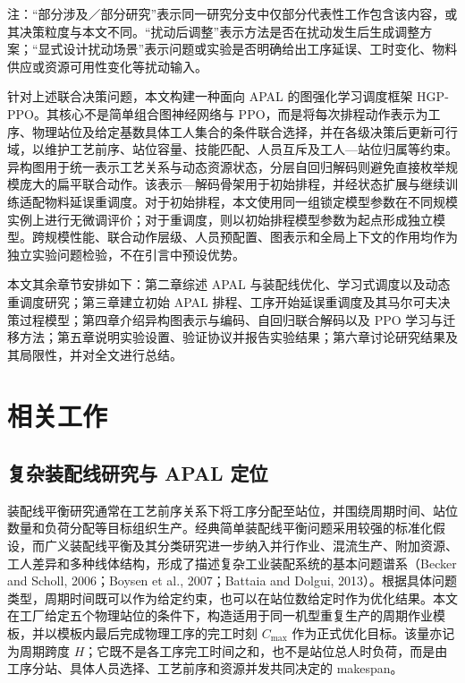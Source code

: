 \documentclass[journal,10pt]{IEEEtran}
\begin{document}
注：``部分涉及／部分研究''表示同一研究分支中仅部分代表性工作包含该内容，或其决策粒度与本文不同。``扰动后调整''表示方法是否在扰动发生后生成调整方案；``显式设计扰动场景''表示问题或实验是否明确给出工序延误、工时变化、物料供应或资源可用性变化等扰动输入。

针对上述联合决策问题，本文构建一种面向 APAL 的图强化学习调度框架 HGP-PPO。其核心不是简单组合图神经网络与 PPO，而是将每次排程动作表示为工序、物理站位及给定基数具体工人集合的条件联合选择，并在各级决策后更新可行域，以维护工艺前序、站位容量、技能匹配、人员互斥及工人---站位归属等约束。异构图用于统一表示工艺关系与动态资源状态，分层自回归解码则避免直接枚举规模庞大的扁平联合动作。该表示---解码骨架用于初始排程，并经状态扩展与继续训练适配物料延误重调度。对于初始排程，本文使用同一组锁定模型参数在不同规模实例上进行无微调评价；对于重调度，则以初始排程模型参数为起点形成独立模型。跨规模性能、联合动作层级、人员预配置、图表示和全局上下文的作用均作为独立实验问题检验，不在引言中预设优势。

本文其余章节安排如下：第二章综述 APAL 与装配线优化、学习式调度以及动态重调度研究；第三章建立初始 APAL 排程、工序开始延误重调度及其马尔可夫决策过程模型；第四章介绍异构图表示与编码、自回归联合解码以及 PPO 学习与迁移方法；第五章说明实验设置、验证协议并报告实验结果；第六章讨论研究结果及其局限性，并对全文进行总结。

\section{相关工作}\label{ux76f8ux5173ux5de5ux4f5c}

\subsection{复杂装配线研究与 APAL 定位}\label{ux590dux6742ux88c5ux914dux7ebfux7814ux7a76ux4e0e-apal-ux5b9aux4f4d}

装配线平衡研究通常在工艺前序关系下将工序分配至站位，并围绕周期时间、站位数量和负荷分配等目标组织生产。经典简单装配线平衡问题采用较强的标准化假设，而广义装配线平衡及其分类研究进一步纳入并行作业、混流生产、附加资源、工人差异和多种线体结构，形成了描述复杂工业装配系统的基本问题谱系（Becker and Scholl, 2006；Boysen et al., 2007；Battaia and Dolgui, 2013）。根据具体问题类型，周期时间既可以作为给定约束，也可以在站位数给定时作为优化结果。本文在工厂给定五个物理站位的条件下，构造适用于同一机型重复生产的周期作业模板，并以模板内最后完成物理工序的完工时刻 \(C_{\max}\) 作为正式优化目标。该量亦记为周期跨度 \(H\)；它既不是各工序完工时间之和，也不是站位总人时负荷，而是由工序分站、具体人员选择、工艺前序和资源并发共同决定的 makespan。
\end{document}
